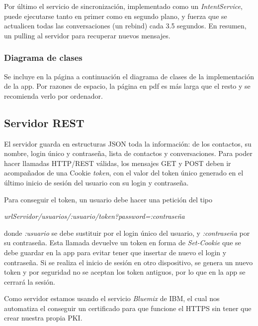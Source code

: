 \documentclass[]{article}
\begin{document}
\hfill

Por último el servicio de sincronización, implementado como un \textit{IntentService}, puede ejecutarse tanto en primer como en segundo plano, y fuerza que se actualicen todas las conversaciones (un rebind) cada 3.5 segundos. En resumen, un pulling al servidor para recuperar nuevos mensajes.

\hfill



\subsubsection{Diagrama de clases}

Se incluye en la página a continuación el diagrama de clases de la implementación de la app. Por razones de espacio, la página en pdf es más larga que el resto y se recomienda verlo por ordenador.



\subsection{Servidor REST}

El servidor guarda en estructuras JSON toda la información: de los contactos, su nombre, login único y contraseña, lista de contactos y conversaciones. Para poder hacer llamadas HTTP/REST válidas, los mensajes GET y POST deben ir acompañados de una Cookie \textit{token}, con el valor del token único generado en el último inicio de sesión del usuario con su login y contraseña.

Para conseguir el token, un usuario debe hacer una petición del tipo

 \textit{urlServidor/usuarios/:usuario/token?password=:contraseña}
 
  donde \textit{:usuario} se debe sustituir por el login único del usuario, y \textit{:contraseña} por su contraseña. Esta llamada devuelve un token en forma de \textit{Set-Cookie} que se debe guardar en la app para evitar tener que insertar de nuevo el login y contraseña. Si se realiza el inicio de sesión en otro dispositivo, se genera un nuevo token y por seguridad no se aceptan los token antiguos, por lo que en la app se cerrará la sesión.

\hfill

Como servidor estamos usando el servicio \textit{Bluemix} de IBM, el cual nos automatiza el conseguir un certificado para que funcione el HTTPS sin tener que crear nuestra propia PKI.
\end{document}
